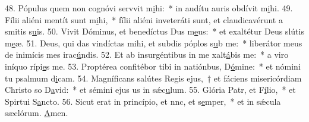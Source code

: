 48. Pópulus quem non cognóvi servvit m\uline{i}hi:~* in audítu auris obdívit m\uline{i}hi.
49. Fílii aliéni mentít sunt m\uline{i}hi,~* fílii aliéni inveteráti sunt, et claudicavérunt a smitis s\uline{u}is.
50. Vivit Dóminus, et benedíctus Dus m\uline{e}us:~* et exaltétur Deus slútis m\uline{e}æ.
51. Deus, qui das vindíctas mihi, et subdis póplos s\uline{u}b me:~* liberátor meus de inimícis mes irac\uline{ú}ndis.
52. Et ab insurgéntibus in me xalt\uline{á}bis me:~* a viro iníquo rípi\uline{e}s me.
53. Proptérea confitébor tibi in natiónbus, D\uline{ó}mine:~* et nómini tu psalmum d\uline{i}cam.
54. Magníficans salútes Regis ejus,~† et fáciens misericórdiam Christo so D\uline{a}vid:~* et sémini ejus us in sǽc\uline{u}lum.
55. Glória Patr, et F\uline{í}lio,~* et Spirtui S\uline{a}ncto.
56. Sicut erat in princípio, et nnc, et s\uline{e}mper,~* et in sǽcula sæclórum. \uline{A}men.
